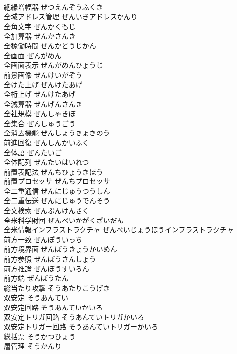 \documentclass[8pt]{extreport}
\begin{document}
\begin{CJK}{UTF8}{min}
\\	絶縁増幅器	ぜつえんぞうふくき	
\\	全域アドレス管理	ぜんいきアドレスかんり	
\\	全角文字	ぜんかくもじ	
\\	全加算器	ぜんかさんき	
\\	全稼働時間	ぜんかどうじかん	
\\	全画面	ぜんがめん	
\\	全画面表示	ぜんがめんひょうじ	
\\	前景画像	ぜんけいがぞう	
\\	全けた上げ	ぜんけたあげ	
\\	全桁上げ	ぜんけたあげ	
\\	全減算器	ぜんげんさんき	
\\	全社規模	ぜんしゃきぼ	
\\	全集合	ぜんしゅうごう	
\\	全消去機能	ぜんしょうきょきのう	
\\	前進回復	ぜんしんかいふく	
\\	全体語	ぜんたいご	
\\	全体配列	ぜんたいはいれつ	
\\	前置表記法	ぜんちひょうきほう	
\\	前置プロセッサ	ぜんちプロセッサ	
\\	全二重通信	ぜんにじゅうつうしん	
\\	全二重伝送	ぜんにじゅうでんそう	
\\	全文検索	ぜんぶんけんさく	
\\	全米科学財団	ぜんべいかがくざいだん	
\\	全米情報インフラストラクチャ	ぜんべいじょうほうインフラストラクチャ	
\\	前方一致	ぜんぽういっち	
\\	前方境界面	ぜんぽうきょうかいめん	
\\	前方参照	ぜんぽうさんしょう	
\\	前方推論	ぜんぽうすいろん	
\\	前方端	ぜんぽうたん	
\\	総当たり攻撃	そうあたりこうげき	
\\	双安定	そうあんてい	
\\	双安定回路	そうあんていかいろ	
\\	双安定トリガ回路	そうあんていトリガかいろ	
\\	双安定トリガー回路	そうあんていトリガーかいろ	
\\	総括票	そうかつひょう	
\\	層管理	そうかんり	

\end{CJK}
\end{document}
